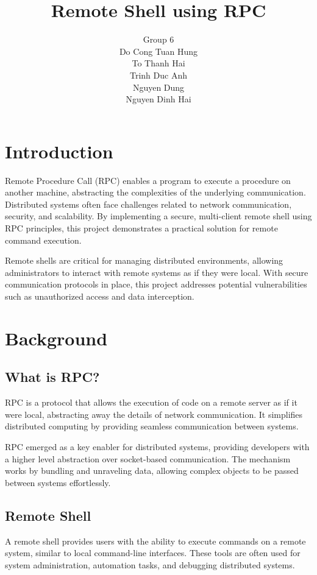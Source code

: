 \documentclass[12pt,a4paper]{report}
\title{Remote Shell using RPC}
\author{Group 6\\Do Cong Tuan Hung\\ To Thanh Hai\\ Trinh Duc Anh\\ Nguyen Dung\\ Nguyen Dinh Hai}
\date{}
\begin{document}
\maketitle

\tableofcontents

\chapter{Introduction}
Remote Procedure Call (RPC) enables a program to execute a procedure on another machine, abstracting the complexities of the underlying communication. 
Distributed systems often face challenges related to network communication, security, and scalability. By implementing a secure, multi-client remote shell using RPC principles, this project demonstrates a practical solution for remote command execution.

Remote shells are critical for managing distributed environments, allowing administrators to interact with remote systems as if they were local. With secure communication protocols in place, this project addresses potential vulnerabilities such as unauthorized access and data interception.

\chapter{Background}
\section{What is RPC?}
RPC is a protocol that allows the execution of code on a remote server as if it were local, abstracting away the details of network communication. It simplifies distributed computing by providing seamless communication between systems. 

RPC emerged as a key enabler for distributed systems, providing developers with a higher level abstraction over socket-based communication. The mechanism works by bundling and unraveling data, allowing complex objects to be passed between systems effortlessly.

\section{Remote Shell}
A remote shell provides users with the ability to execute commands on a remote system, similar to local command-line interfaces. These tools are often used for system administration, automation tasks, and debugging distributed systems.
\end{document}
